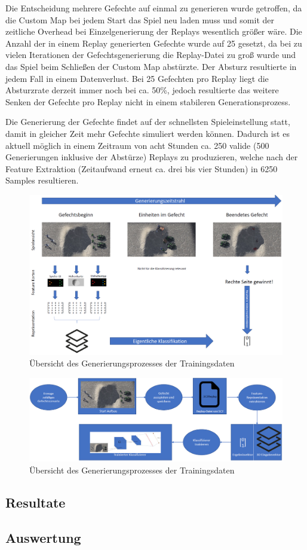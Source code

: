 Die Entscheidung mehrere Gefechte auf einmal zu generieren wurde getroffen, da die Custom Map bei jedem Start das Spiel neu laden muss und somit der zeitliche Overhead bei Einzelgenerierung der Replays wesentlich größer wäre. Die Anzahl der in einem Replay generierten Gefechte wurde auf 25 gesetzt, da bei zu vielen Iterationen der Gefechtsgenerierung die Replay-Datei zu groß wurde und das Spiel beim Schließen der Custom Map abstürzte. Der Absturz resultierte in jedem Fall in einem Datenverlust. Bei 25 Gefechten pro Replay liegt die Absturzrate derzeit immer noch bei ca. 50\%, jedoch resultierte das weitere Senken der Gefechte pro Replay nicht in einem stabileren Generationsprozess. 

Die Generierung der Gefechte findet auf der schnellsten Spieleinstellung statt, damit in gleicher Zeit mehr Gefechte simuliert werden können. Dadurch ist es aktuell möglich in einem Zeitraum von acht Stunden ca. 250 valide (500 Generierungen inklusive der Abstürze) Replays zu produzieren, welche nach der Feature Extraktion (Zeitaufwand erneut ca. drei bis vier Stunden) in 6250 Samples resultieren. 

\newpage
\begin{figure}[H]
\thispagestyle{empty}
\centering
\includegraphics[angle=90,scale=0.6]{pictures/grafiken/Folie1}
\caption{Übersicht des Generierungsprozesses der Trainingsdaten}
\label{fig:overview2}
\end{figure}

\begin{figure}[H]
\thispagestyle{empty}
\centering
\includegraphics[angle=90,scale=0.6]{pictures/grafiken/Folie2}
\caption{Übersicht des Generierungsprozesses der Trainingsdaten}
\label{fig:overview1}
\end{figure}


\subsection{Resultate}
\label{Resultate}

\subsection{Auswertung}
\label{Auswertung}